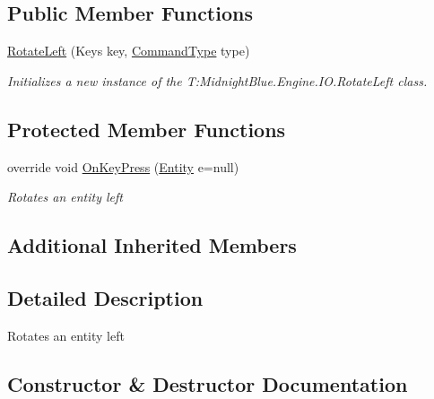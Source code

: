 \subsection*{Public Member Functions}
\begin{DoxyCompactItemize}
\item 
\hyperlink{class_midnight_blue_1_1_engine_1_1_i_o_1_1_rotate_left_a3d2b8d6a0839225e017bf32d493ee302}{Rotate\+Left} (Keys key, \hyperlink{namespace_midnight_blue_1_1_engine_1_1_i_o_a8bc3f159399ecadd590f7df1b54354b0}{Command\+Type} type)
\begin{DoxyCompactList}\small\item\em Initializes a new instance of the T\+:\+Midnight\+Blue.\+Engine.\+I\+O.\+Rotate\+Left class. \end{DoxyCompactList}\end{DoxyCompactItemize}
\subsection*{Protected Member Functions}
\begin{DoxyCompactItemize}
\item 
override void \hyperlink{class_midnight_blue_1_1_engine_1_1_i_o_1_1_rotate_left_a4c56e0447bb253e4c53c206788e228da}{On\+Key\+Press} (\hyperlink{class_midnight_blue_1_1_engine_1_1_entity_component_1_1_entity}{Entity} e=null)
\begin{DoxyCompactList}\small\item\em Rotates an entity left \end{DoxyCompactList}\end{DoxyCompactItemize}
\subsection*{Additional Inherited Members}


\subsection{Detailed Description}
Rotates an entity left 



\subsection{Constructor \& Destructor Documentation}
\hypertarget{class_midnight_blue_1_1_engine_1_1_i_o_1_1_rotate_left_a3d2b8d6a0839225e017bf32d493ee302}{}\label{class_midnight_blue_1_1_engine_1_1_i_o_1_1_rotate_left_a3d2b8d6a0839225e017bf32d493ee302} 
